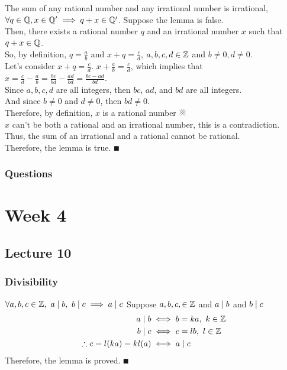 \documentclass{report}
\begin{document}
\Lemma The sum of any rational number and any irrational number is irrational, $\forall q\in\mathbb{Q}, x\in\mathbb{Q}' \implies q + x \in \mathbb{Q}'$.
\proof Suppose the lemma is false. \\
Then, there exists a rational number $q$ and an irrational number $x$ such that $q + x \in \mathbb{Q}$. \\
So, by definition, $q = \frac{a}{b}$ and $x + q = \frac{c}{d}$, $a,b,c,d\in\mathbb{Z}$ and $b\neq0,d\neq0$. \\
Let's consider $x + q = \frac{c}{d}$. $x + \frac{a}{b} = \frac{c}{d}$, which implies that $x = \frac{c}{d} - \frac{a}{b} = \frac{bc}{bd} - \frac{ad}{bd} = \frac{bc - ad}{bd}$. \\
Since $a,b,c,d$ are all integers, then $bc$, $ad$, and $bd$ are all integers. \\
And since $b\neq0$ and $d\neq0$, then $bd\neq0$. \\
Therefore, by definition, $x$ is a rational number $\CONTRA$ \\
$x$ can't be both a rational and an irrational number, this is a contradiction. \\
Thus, the sum of an irrational and a rational cannot be rational. \\
Therefore, the lemma is true. $\QED$

\subsection*{Questions}
\qs{}{}

\chapter{Week 4}
\section{Lecture 10}
\subsection*{Divisibility}

\Lemma $\forall a,b,c\in\mathbb{Z},\ a\mathrel{\mid} b,\ b\mathrel{\mid} c \implies a\mathrel{\mid} c$
\proof  Suppose $a,b,c,\in\mathbb{Z}$ and $a\mathrel{\mid} b$ and $b\mathrel{\mid} c$ 
\begin{align*}
	a\mathrel{\mid} b &\iff b = ka,\ k\in\mathbb{Z} \\
	b\mathrel{\mid} c &\iff c = lb,\ l\in\mathbb{Z} \\
	\therefore c = l(ka) = kl(a) &\iff a \mathrel{\mid} c   
\end{align*}
Therefore, the lemma is proved. $\QED$
\end{document}
